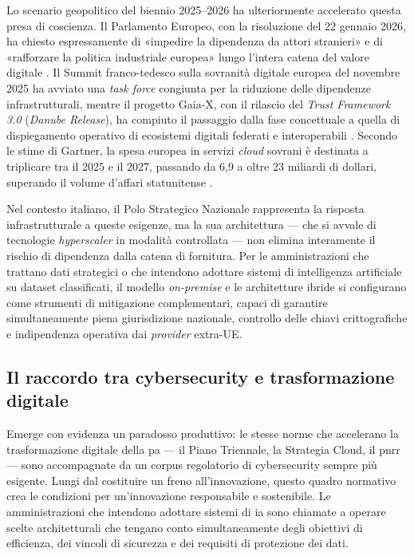 Lo scenario geopolitico del biennio 2025--2026 ha ulteriormente accelerato questa presa di coscienza. Il Parlamento Europeo, con la risoluzione del 22 gennaio 2026, ha chiesto espressamente di «impedire la dipendenza da attori stranieri» e di «rafforzare la politica industriale europea» lungo l'intera catena del valore digitale \parencite{EUParl_TechSovereignty2025}. Il Summit franco-tedesco sulla sovranità digitale europea del novembre 2025 ha avviato una \textit{task force} congiunta per la riduzione delle dipendenze infrastrutturali, mentre il progetto Gaia-X, con il rilascio del \textit{Trust Framework 3.0} (\textit{Danube Release}), ha compiuto il passaggio dalla fase concettuale a quella di dispiegamento operativo di ecosistemi digitali federati e interoperabili \parencite{GaiaX2025}. Secondo le stime di Gartner, la spesa europea in servizi \textit{cloud} sovrani è destinata a triplicare tra il 2025 e il 2027, passando da 6,9 a oltre 23 miliardi di dollari, superando il volume d'affari statunitense \parencite{Gartner_SovereignCloud2026}.

Nel contesto italiano, il Polo Strategico Nazionale rappresenta la risposta infrastrutturale a queste esigenze, ma la sua architettura --- che si avvale di tecnologie \textit{hyperscaler} in modalità controllata --- non elimina interamente il rischio di dipendenza dalla catena di fornitura. Per le amministrazioni che trattano dati strategici o che intendono adottare sistemi di intelligenza artificiale su dataset classificati, il modello \textit{on-premise} e le architetture ibride si configurano come strumenti di mitigazione complementari, capaci di garantire simultaneamente piena giurisdizione nazionale, controllo delle chiavi crittografiche e indipendenza operativa dai \textit{provider} extra-UE.

\subsection{Il raccordo tra cybersecurity e trasformazione digitale}

Emerge con evidenza un paradosso produttivo: le stesse norme che accelerano la trasformazione digitale della \gls{pa} --- il Piano Triennale, la Strategia Cloud, il \gls{pnrr} --- sono accompagnate da un corpus regolatorio di cybersecurity sempre più esigente. Lungi dal costituire un freno all'innovazione, questo quadro normativo crea le condizioni per un'innovazione responsabile e sostenibile. Le amministrazioni che intendono adottare sistemi di \gls{ia} sono chiamate a operare scelte architetturali che tengano conto simultaneamente degli obiettivi di efficienza, dei vincoli di sicurezza e dei requisiti di protezione dei dati.

